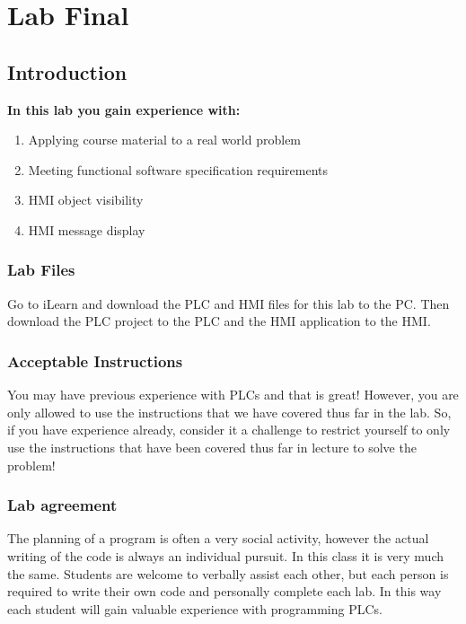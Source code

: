 \chapter{Lab Final}
\setcounter{TASignatures}{0}
\setcounter{AsideCounter}{0}

\section{Introduction}
    \vspace{0.1em}

    \textbf{In this lab you gain experience with:}
    \begin{enumerate}
        \item Applying course material to a real world problem
        \item Meeting functional software specification requirements
        \item HMI object visibility
        \item HMI message display
    \end{enumerate}

\subsection{Lab Files}

Go to iLearn and download the PLC and HMI files for this lab to the PC. Then download the PLC project to the PLC and the HMI application to the HMI. 

\subsection{Acceptable Instructions}

You may have previous experience with PLCs and that is great! However, you are only allowed to use the instructions that we have covered thus far in the lab. So, if you have experience already, consider it a challenge to restrict yourself to only use the instructions that have been covered thus far in lecture to solve the problem!

\subsection{Lab agreement}

The planning of a program is often a very social activity, however the actual writing of the code is always an individual pursuit. In this class it is very much the same. Students are welcome to verbally assist each other, but each person is required to write their own code and personally complete each lab. In this way each student will gain valuable experience with programming PLCs. 

